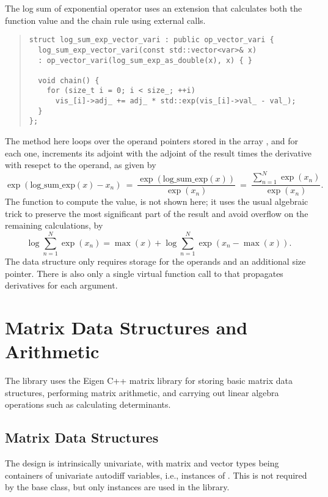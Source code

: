 \documentclass[10pt]{article}
\begin{document}
The log sum of exponential operator uses an extension that calculates
both the function value and the chain rule using external calls.
%
\begin{quote}
\begin{Verbatim}
struct log_sum_exp_vector_vari : public op_vector_vari {
  log_sum_exp_vector_vari(const std::vector<var>& x)
  : op_vector_vari(log_sum_exp_as_double(x), x) { }

  void chain() {
    for (size_t i = 0; i < size_; ++i)
      vis_[i]->adj_ += adj_ * std::exp(vis_[i]->val_ - val_);
  }
};
\end{Verbatim}
\end{quote}
%
The  method here loops over the operand pointers stored
in the array , and for each one, increments its
adjoint with the adjoint of the result times the derivative with
resepct to the operand, as given by
%
\[
\exp(\mbox{log\_sum\_exp}(x) - x_n)
\ = \
\frac{\exp(\mbox{log\_sum\_exp}(x))}{\exp(x_n)}
\ = \
\frac{\sum_{n=1}^N \exp(x_n)}
     {\exp(x_n)}.
\]
%
The function to compute the value,  is
not shown here;  it uses the usual algebraic trick to preserve the
most significant part of the result and avoid overflow on the
remaining calculations, by
%
\[
\log \sum_{n=1}^N \exp(x_n)
= \max(x) + \log \sum_{n=1}^N \exp(x_n - \max(x)).
\]
%
The data structure only requires storage for the operands and an
additional size pointer.  There is also only a single virtual function
call to \code{chain} that propagates derivatives for each argument.


\section{Matrix Data Structures and Arithmetic}

The  library uses the Eigen C++ matrix library for
storing basic matrix data structures, performing matrix arithmetic,
and carrying out linear algebra operations such as calculating
determinants.

\subsection{Matrix Data Structures}

The design is intrinsically univariate, with matrix and vector types
being containers of univariate autodiff variables, i.e., instances of
\code{var}.  This is not required by the \code{chainable} base class,
but only \code{vari} instances are used in the library.
\end{document}
